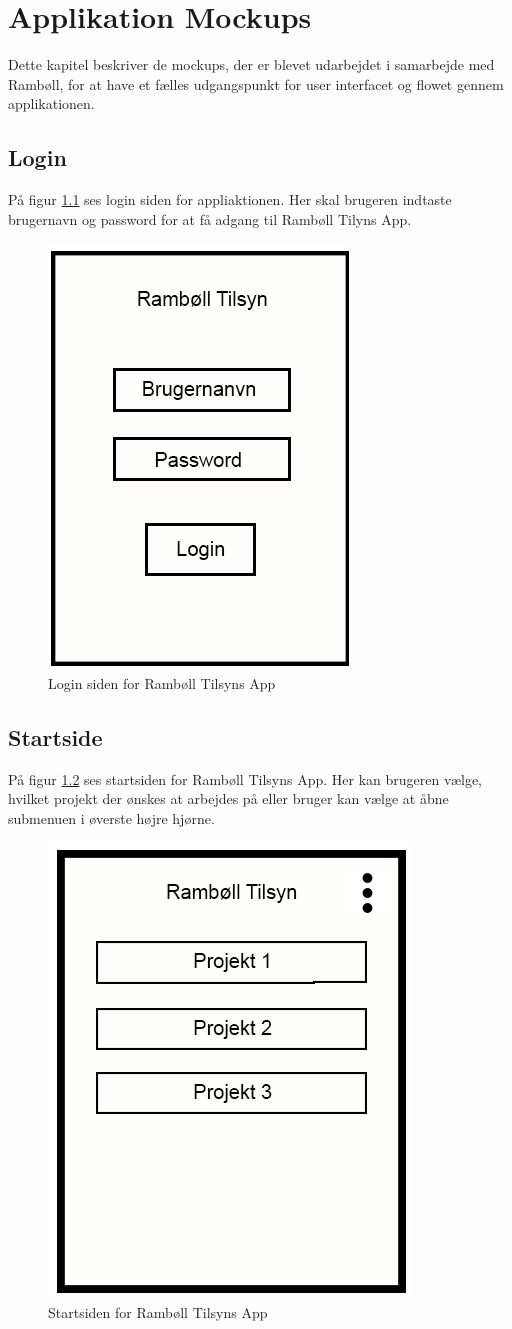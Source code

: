 \chapter{Applikation Mockups}
Dette kapitel beskriver de mockups, der er blevet udarbejdet i samarbejde med Rambøll, for at have et fælles udgangspunkt for user interfacet og flowet gennem applikationen. \\

\section{Login}\label{sec:LoginMock}
På figur \ref{fig:LoginMock} ses login siden for appliaktionen. Her skal brugeren indtaste brugernavn og password for at få adgang til Rambøll Tilyns App.
\begin{figure}[H]
	\centering
	\includegraphics[width=0.4\linewidth]{MockUps/Mock/Ramboell-Login}
	\caption{Login siden for Rambøll Tilsyns App}
	\label{fig:LoginMock}
\end{figure}

\clearpage

\section{Startside}\label{sec:StartMock}
På figur \ref{fig:StartMock} ses startsiden for Rambøll Tilsyns App. Her kan brugeren vælge, hvilket projekt der ønskes at arbejdes på eller bruger kan vælge at åbne submenuen i øverste højre hjørne.
\begin{figure}[H]
	\centering
	\includegraphics[width=0.4\linewidth]{MockUps/Mock/Ramboell-Startside}
	\caption{Startsiden for Rambøll Tilsyns App}
	\label{fig:StartMock}
\end{figure}

